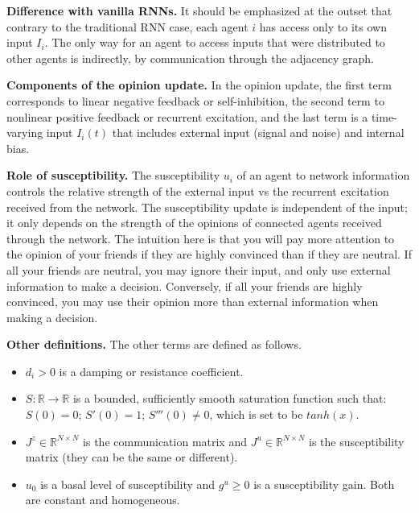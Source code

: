 \documentclass[]{article}
\begin{document}
\textbf{Difference with vanilla RNNs.} It should be emphasized at the outset that contrary to the traditional RNN case, each agent $i$ has access only to its own input $I_i$. The only way for an agent to access inputs that were distributed to other agents is indirectly, by communication through the adjacency graph.

\textbf{Components of the opinion update.} In the opinion update, the first term corresponds to linear negative feedback or self-inhibition, the second term to nonlinear positive feedback or recurrent excitation, and the last term is a time-varying input $I_i(t)$ that includes external input (signal and noise) and internal bias.

\textbf{Role of susceptibility.} The susceptibility $u_i$ of an agent to network information controls the relative strength of the external input vs the recurrent excitation received from the network. The susceptibility update is independent of the input; it only depends on the strength of the opinions of connected agents received through the network. The intuition here is that you will pay more attention to the opinion of your friends if they are highly convinced than if they are neutral. If all your friends are neutral, you may ignore their input, and only use external information to make a decision. Conversely, if all your friends are highly convinced, you may use their opinion more than external information when making a decision.

\textbf{Other definitions.} The other terms are defined as follows. \begin{itemize}
	\item $d_{i} > 0$ is a damping or resistance coefficient. 
	\item $S: \mathbb{R} \rightarrow \mathbb{R}$ is a bounded, sufficiently smooth saturation function such that: $S(0)=0$; $S'(0)=1$; $S'''(0)\neq0$, which is set to be $tanh(x)$.
	\item $J^z \in \mathbb{R}^{N \times N}$ is the communication matrix and $J^u \in \mathbb{R}^{N \times N}$ is the susceptibility matrix (they can be the same or different).
	\item $u_0$ is a basal level of susceptibility and $g^u \geq 0$ is a susceptibility gain. Both are constant and homogeneous.
\end{itemize}
\end{document}
